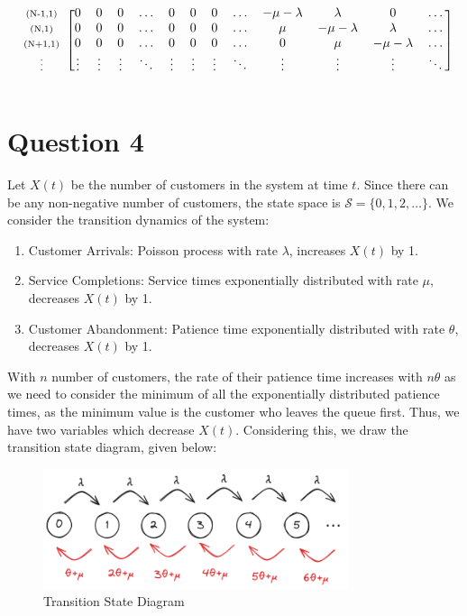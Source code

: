 \documentclass[12pt]{article}
\newcommand{\matindex}[1]{\mbox{\scriptsize#1}}%
\begin{document}
\begin{equation*}
\begin{blockarray}{ccccccccccccc}
\begin{block}{c[cccccccccccc]}
            \matindex{(N-1,1)} & 0 & 0 & 0 & \dots & 0 & 0 & 0 & \dots & -\mu-\lambda & \lambda & 0 & \dots \\
            \matindex{(N,1)} & 0 & 0 & 0 & \dots & 0 & 0 & 0 & \dots & \mu & -\mu-\lambda & \lambda & \dots \\
            \matindex{(N+1,1)} & 0 & 0 & 0 & \dots & 0 & 0 & 0 & \dots & 0 & \mu & -\mu-\lambda & \dots \\
            \matindex{\vdots} & \vdots & \vdots &\vdots & \ddots &\vdots & \vdots &\vdots & \ddots &\vdots & \vdots &\vdots & \ddots \\ 
        \end{block}
    \end{blockarray}
\end{equation*}

\section*{Question 4}

Let $X(t)$ be the number of customers in the system at time $t$. Since there can be any non-negative number of customers, the state space is $\mathcal{S} = \{0,1,2,\dots\}$. We consider the transition dynamics of the system: \begin{enumerate}
    \item Customer Arrivals: Poisson process with rate $\lambda$, increases $X(t)$ by 1. 
    \item Service Completions: Service times exponentially distributed with rate $\mu$, decreases $X(t)$ by 1. 
    \item Customer Abandonment: Patience time exponentially distributed with rate $\theta$, decreases $X(t)$ by 1.
\end{enumerate} With $n$ number of customers, the rate of their patience time increases with $n\theta$ as we need to consider the minimum of all the exponentially distributed patience times, as the minimum value is the customer who leaves the queue first. Thus, we have two variables which decrease $X(t)$. Considering this, we draw the transition state diagram, given below: 

\begin{figure}[H]
    \centering
    \includegraphics[width=0.8\textwidth]{Images/Q4.png}
    \caption{Transition State Diagram}
    \label{fig:4-tsd}
\end{figure} 
\end{document}
